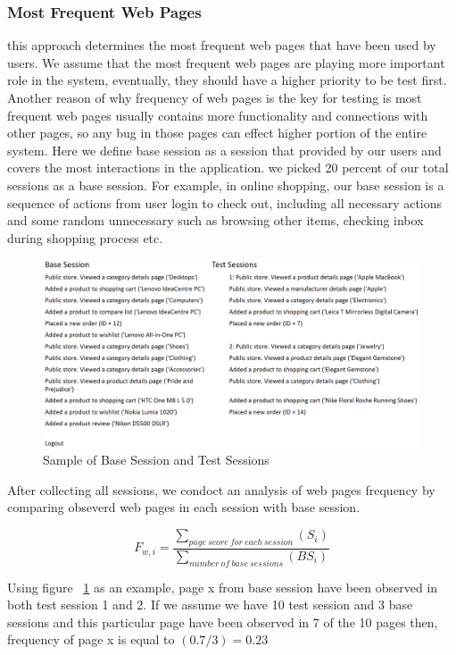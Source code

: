 \subsubsection{Most Frequent Web Pages}
this approach determines the most frequent web pages that have been used by users. 
We assume that the most frequent web pages are playing more important role in the system, 
eventually, they should have a higher priority to be test first. Another reason
 of why frequency of web pages is the key for testing is most frequent web pages usually 
 contains more functionality and connections with other pages, so any bug in 
 those pages can effect higher portion of the entire system. 
 Here we define base session as a session that provided by our users 
 and covers the most interactions in the application.
 we picked 20 percent of our total sessions as a base session. 
 For example, in online shopping, our base session is a sequence of actions from user login to check out, including all necessary actions and some random unnecessary such as browsing other items, checking inbox during shopping process etc. 
 \begin{figure}[t]
 	\centering
 	\includegraphics[width=0.90\linewidth]{./SessionSample.png}
 	\vspace*{3pt}
 	\caption{Sample of Base Session and Test Sessions}
 	\label{fig:sessions}
 \end{figure}

After collecting all sessions, we condoct an analysis of web pages frequency 
by comparing obseverd web pages in each session with base session. 

\[
{F_{w,i} = \frac {\sum_{{page\: score\: for \: each\: session}}(S_{i})}
	{\sum_{{number \: of \: base \: sessions}}({BS_{i}})}}	
\]

Using figure ~\ref{fig:sessions} as an example, page x from base session 
have been observed in both test session 1 and 2. If we assume we have 10 test session and 3 base sessions
and this particular page have been observed in 7 of the 10 pages then, frequency of page x is equal to 
$(0.7 / 3) = 0.23$


